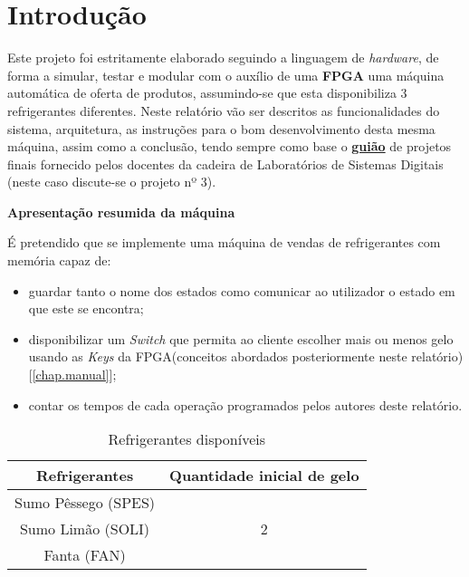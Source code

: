 \documentclass{report}
\begin{document}
\chapter{Introdução}
\label{chap.introducao}
Este projeto foi estritamente elaborado seguindo a linguagem de \textit{hardware}, de forma a simular, testar e modular com o auxílio de uma \textbf{FPGA} uma máquina automática de oferta de produtos, assumindo-se que esta disponibiliza 3 refrigerantes diferentes.
Neste relatório vão ser descritos as funcionalidades do sistema, arquitetura, as instruções para o bom desenvolvimento desta mesma máquina, assim como a conclusão, tendo sempre como base o \href{https://elearning.ua.pt/mod/folder/view.php?id=942630}{\textbf{guião}} de projetos finais fornecido pelos docentes da cadeira de Laboratórios de Sistemas Digitais (neste caso discute-se o projeto nº 3). 
%
\begin{center}
\LARGE\textbf{{Apresentação resumida da máquina}}
\end{center}
%
É pretendido que se implemente uma máquina de vendas de refrigerantes com memória capaz de:
%
\begin{itemize}
    \item guardar tanto o nome dos estados como comunicar ao utilizador o estado em que este se encontra;
    \item disponibilizar um \textit{Switch} que permita ao cliente escolher mais ou menos gelo usando as \textit{Keys} da FPGA(conceitos abordados posteriormente neste relatório)[\ref{chap.manual}];
    \item contar os tempos de cada operação programados pelos autores deste relatório.
\end{itemize} 
%
%
\begin{table}
    \centering
    \begin{tabular}{|c|c|}
        \hline
        \textbf{Refrigerantes} & \textbf{Quantidade inicial de gelo} \\ \hline
        Sumo Pêssego (SPES) &\\
        Sumo Limão (SOLI)& 2\\ 
        Fanta (FAN) & \\
        \hline
    \end{tabular} \label{tabela}
    \caption{Refrigerantes disponíveis}
\end{table}
\end{document}
